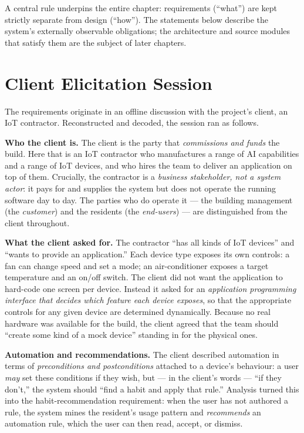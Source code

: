 A central rule underpins the entire chapter: requirements
(``what'') are kept strictly separate from design (``how''). The statements below
describe the system's externally observable obligations; the architecture and source
modules that satisfy them are the subject of later chapters.

\section{Client Elicitation Session}
\label{sec:elicitation}

The requirements originate in an offline discussion with the project's client, an
IoT contractor. Reconstructed and decoded, the session ran as follows.

\textbf{Who the client is.} The client is the party
that \emph{commissions and funds} the build. Here that is an IoT contractor who
manufactures a range of AI capabilities and a range of IoT devices, and who hires the
team to deliver an application on top of them. Crucially, the contractor is a
\emph{business stakeholder, not a system actor}: it pays for and supplies the system
but does not operate the running software day to day. The parties who do operate it ---
the building management (the \emph{customer}) and the residents (the \emph{end-users})
--- are distinguished from the client throughout.

\textbf{What the client asked for.} The contractor ``has all kinds of IoT devices''
and ``wants to provide an application.'' Each device type exposes its own controls:
a fan can change speed and set a mode; an air-conditioner exposes a target temperature
and an on/off switch. The client did not want the application to hard-code one screen
per device. Instead it asked for an \emph{application programming interface that
decides which feature each device exposes}, so that the appropriate controls for any
given device are determined dynamically. Because no real hardware was available for
the build, the client agreed that the team should ``create some kind of a mock
device'' standing in for the physical ones.

\textbf{Automation and recommendations.} The client described automation in terms of
\emph{preconditions and postconditions} attached to a device's behaviour: a user
\emph{may} set these conditions if they wish, but --- in the client's words ---
``if they don't,'' the system should ``find a habit and apply that rule.'' Analysis
turned this into the habit-recommendation requirement: when the user has not authored
a rule, the system mines the resident's usage pattern and \emph{recommends} an
automation rule, which the user can then read, accept, or dismiss.

